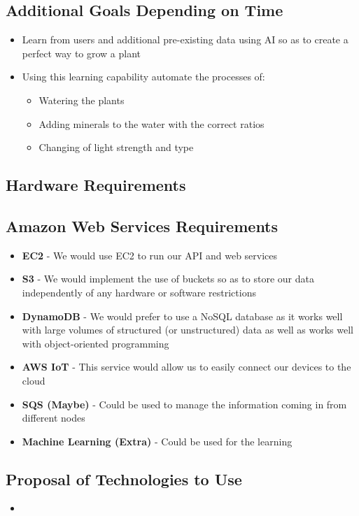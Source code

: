 \documentclass{article}
\begin{document}
	\subsection{Additional Goals Depending on Time}
		\begin{itemize}
			\item Learn from users and additional pre-existing data using AI so as to create a perfect way to grow a plant
			\item Using this learning capability automate the processes of:
				\begin{itemize}
					\item Watering the plants
					\item Adding minerals to the water with the correct ratios
					\item Changing of light strength and type
				\end{itemize}
		\end{itemize}
	\subsection{Hardware Requirements}
	\subsection{Amazon Web Services Requirements}
		\begin{itemize}
			\item \textbf{EC2} - We would use EC2 to run our API and web services
			\item \textbf{S3} - We would implement the use of buckets so as to store our data independently of any hardware or software restrictions
			\item \textbf{DynamoDB} - We would prefer to use a NoSQL database as it works well with large volumes of structured (or unstructured) data as well as works well with object-oriented programming
			\item \textbf{AWS IoT} - This service would allow us to easily connect our devices to the cloud
			\item \textbf{SQS (Maybe)} - Could be used to manage the information coming in from different nodes
			\item \textbf{Machine Learning (Extra)} - Could be used for the learning
		\end{itemize}
	\subsection{Proposal of Technologies to Use}
		\begin{itemize}
			\item
		\end{itemize}
\end{document}
